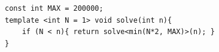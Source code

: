 \begin{verbatim}
const int MAX = 200000;
template <int N = 1> void solve(int n){
	if (N < n){ return solve<min(N*2, MAX)>(n); }
}
\end{verbatim}